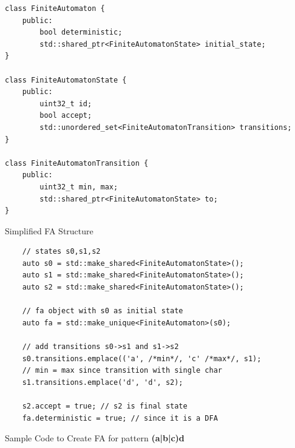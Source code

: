 \begin{listing}[htpb]
\begin{verbatim}
class FiniteAutomaton {
    public:
        bool deterministic;
        std::shared_ptr<FiniteAutomatonState> initial_state;
}

class FiniteAutomatonState {
    public:
        uint32_t id;
        bool accept;
        std::unordered_set<FiniteAutomatonTransition> transitions;
}

class FiniteAutomatonTransition {
    public:
        uint32_t min, max;
        std::shared_ptr<FiniteAutomatonState> to;
}
\end{verbatim}
\caption[Finite Automata Structure]{Simplified FA Structure}\label{lst:fas}
\end{listing}


\begin{listing}[htpb]
\begin{verbatim}
    // states s0,s1,s2
    auto s0 = std::make_shared<FiniteAutomatonState>();
    auto s1 = std::make_shared<FiniteAutomatonState>();
    auto s2 = std::make_shared<FiniteAutomatonState>();
    
    // fa object with s0 as initial state
    auto fa = std::make_unique<FiniteAutomaton>(s0);
    
    // add transitions s0->s1 and s1->s2
    s0.transitions.emplace(('a', /*min*/, 'c' /*max*/, s1);
    // min = max since transition with single char
    s1.transitions.emplace('d', 'd', s2);
    
    s2.accept = true; // s2 is final state
    fa.deterministic = true; // since it is a DFA
\end{verbatim}
\caption[Sample Code to Create FA for pattern]{Sample Code to Create FA for pattern \textbf{(a|b|c)d}}\label{lst:faexamplecode}
\end{listing}

